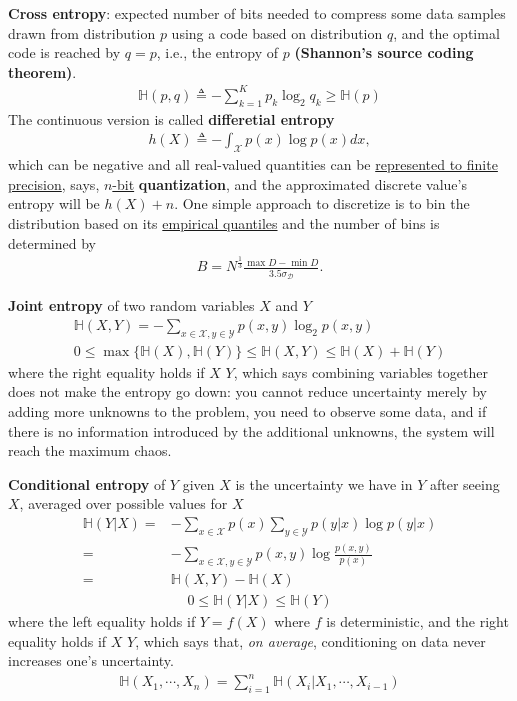 \textbf{Cross entropy}: expected number of bits needed to compress some data
samples drawn from distribution $p$ using a code based on distribution $q$,
and the optimal code is reached by $q=p$, i.e., the entropy of $p$ \textbf{(Shannon's source coding theorem)}.
\begin{gather}
    \mathbb{H}(p,q)\triangleq-\sum_{k=1}^K p_k\log_2{q_k}\ge\mathbb{H}(p)
\end{gather}
The continuous version is called \textbf{differetial entropy}
\begin{gather}
    h(X)\triangleq-\int_{\mathcal{X}}p(x)\log{p(x)}dx,
\end{gather}
which can be negative and 
all real-valued quantities can be \uline{represented to finite precision}, 
says, \uline{$n$-bit} \textbf{quantization}, 
and the approximated discrete value's entropy will be $h(X)+n$. 
One simple approach to discretize is to bin the distribution based on its \uline{empirical quantiles} and the number of bins is determined by 
\begin{gather}
    B=N^\frac{1}{3}\frac{\max{D}-\min{D}}{3.5\sigma_\mathcal{D}}.
\end{gather}

\textbf{Joint entropy} of two random variables $X$ and $Y$
\begin{gather}
    \mathbb{H}(X,Y)=-\sum_{x\in\mathcal{X},y\in\mathcal{Y}}p(x,y)\log_2 p(x,y)\\
    0 \leq \max\{\mathbb{H}(X),\mathbb{H}(Y)\} \leq \mathbb{H}(X,Y) \leq \mathbb{H}(X) + \mathbb{H}(Y)
\end{gather}
where the right equality holds if $X$  $Y$,
which says combining variables together does not make the entropy go down: you cannot
reduce uncertainty merely by adding more unknowns to the problem, you need to observe some data,
and if there is no information introduced by the additional unknowns, the system will reach the maximum chaos.

\textbf{Conditional entropy} of $Y$ given $X$ is the uncertainty we have in $Y$ after seeing $X$, averaged
over possible values for $X$
\begin{align}
    \mathbb{H}(Y|X)
    =& -\sum_{x\in\mathcal{X}}p(x)\sum_{y\in\mathcal{Y}}p(y|x)\log{p(y|x)} \\
    =& -\sum_{x\in\mathcal{X},y\in\mathcal{Y}}p(x,y)\log{\frac{p(x,y)}{p(x)}} \\
    =& \mathbb{H}(X,Y)-\mathbb{H}(X)
\end{align}
\begin{gather}
    0 \leq \mathbb{H}(Y|X) \leq \mathbb{H}(Y)
\end{gather}
where the left equality holds if $Y=f(X)$ where $f$ is deterministic, 
and the right equality holds if $X$  $Y$,
which says that, \textit{on average}, conditioning on data never increases one’s uncertainty.
\begin{gather}
    \mathbb{H}(X_1,\cdots,X_n)=\sum_{i=1}^n{\mathbb{H}(X_i|X_1,\cdots,X_{i-1})}
\end{gather}

